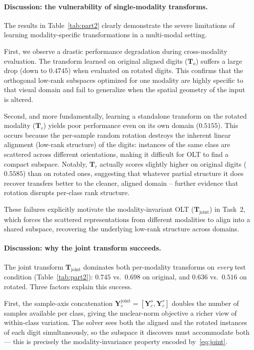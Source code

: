 \documentclass[10pt]{article}
\newcommand{\T}{\mathbf{T}}
\newcommand{\Y}{\mathbf{Y}}
\begin{document}
\paragraph{Discussion: the vulnerability of single-modality transforms.}
The results in Table~\ref{tab:part2} clearly demonstrate the severe
limitations of learning modality-specific transformations in a
multi-modal setting.

First, we observe a drastic performance degradation during
cross-modality evaluation. The transform learned on original aligned
digits ($\T_o$) suffers a large drop (down to $0.4745$) when evaluated
on rotated digits. This confirms that the orthogonal low-rank subspaces
optimized for one modality are highly specific to that visual domain and
fail to generalize when the spatial geometry of the input is altered.

Second, and more fundamentally, learning a standalone transform on the
rotated modality ($\T_r$) yields poor performance even on its own
domain ($0.5155$). This occurs because the per-sample random rotation
destroys the inherent linear alignment (low-rank structure) of the
digits: instances of the same class are scattered across different
orientations, making it difficult for OLT to find a compact subspace.
Notably, $\T_r$ actually scores slightly higher on original digits
($0.5585$) than on rotated ones, suggesting that whatever partial
structure it does recover transfers better to the cleaner, aligned
domain -- further evidence that rotation disrupts per-class rank
structure.

These failures explicitly motivate the modality-invariant OLT
($\T_{\text{joint}}$) in Task~2, which forces the scattered
representations from different modalities to align into a shared
subspace, recovering the underlying low-rank structure across domains.

\paragraph{Discussion: why the joint transform succeeds.}
The joint transform $\T_{\text{joint}}$ dominates both per-modality
transforms on \emph{every} test condition (Table~\ref{tab:part2}):
$0.745$ vs.\ $0.698$ on original, and $0.636$ vs.\ $0.516$ on rotated.
Three factors explain this success.

First, the sample-axis concatenation
$\Y_c^{\text{joint}}=[\Y_c^{o},\Y_c^{r}]$ doubles the number of
samples available per class, giving the nuclear-norm objective a richer
view of within-class variation. The solver sees both the aligned and
the rotated instances of each digit simultaneously, so the subspace it
discovers must accommodate both --- this is precisely the
modality-invariance property encoded by~\eqref{eq:joint}.
\end{document}
